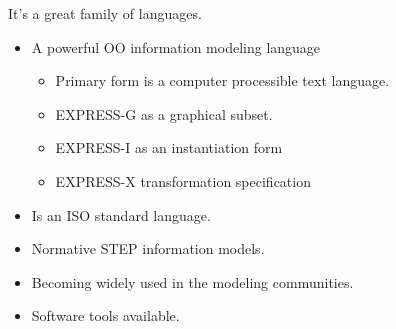 %
%

\begin{remarks}
\remintro


It's a great family of languages.

\remend
\end{remarks}


\begin{itemize}
\item A powerful OO information modeling language
  \begin{itemize}
  \item Primary form is a computer processible text language.
  \item EXPRESS-G as a graphical subset.
  \item EXPRESS-I as an instantiation form 
  \item EXPRESS-X transformation specification
  \end{itemize}
\item Is an ISO standard language.
\item Normative STEP information models.
\item Becoming widely used in the modeling communities.
\item Software tools available.
\end{itemize}

\endinput


